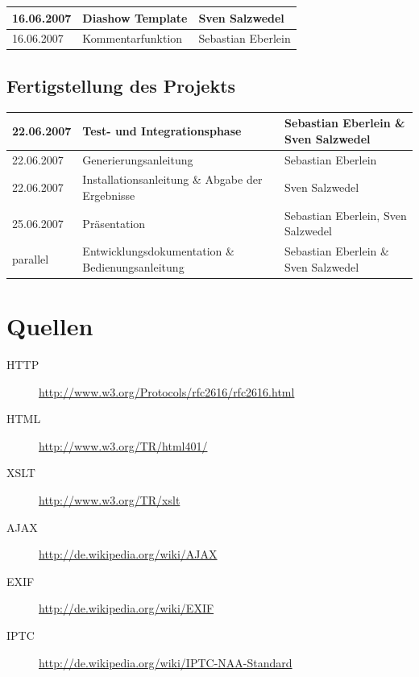 \documentclass[a4paper,12pt,liststotocnumbered]{scrartcl}
\begin{document}
\begin{tabularx}{\textwidth}{|l|X|X|}

	\hline

	16.06.2007&Diashow Template&Sven Salzwedel\\

	\hline

	16.06.2007&Kommentarfunktion&Sebastian Eberlein\\
	
	\hline
	
\end{tabularx}

\subsection{Fertigstellung des Projekts}

\begin{tabularx}{\textwidth}{|l|X|X|}

	\hline

	22.06.2007&Test- und Integrationsphase&Sebastian Eberlein \& Sven
	Salzwedel\\

	\hline

	22.06.2007&Generierungsanleitung&Sebastian Eberlein\\

	\hline

	22.06.2007&Installationsanleitung \& Abgabe der Ergebnisse&Sven
	Salzwedel\\

	\hline

	25.06.2007&Präsentation&Sebastian Eberlein, Sven Salzwedel\\

	\hline

	parallel&Entwicklungsdokumentation \& Bedienungsanleitung&Sebastian
	Eberlein \& Sven Salzwedel\\

	\hline

\end{tabularx}

\section{Quellen}

\begin{description}

	\item[HTTP] \url{http://www.w3.org/Protocols/rfc2616/rfc2616.html}

	\item[HTML] \url{http://www.w3.org/TR/html401/}

	\item[XSLT] \url{http://www.w3.org/TR/xslt}

	\item[AJAX] \url{http://de.wikipedia.org/wiki/AJAX}

	\item[EXIF] \url{http://de.wikipedia.org/wiki/EXIF}

	\item[IPTC] \url{http://de.wikipedia.org/wiki/IPTC-NAA-Standard}

\end{description}
\end{document}
